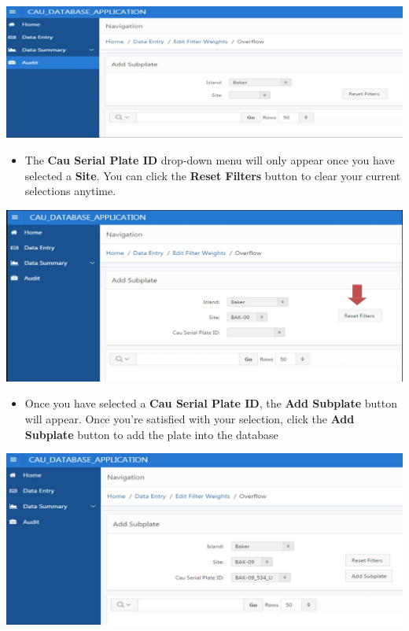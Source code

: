 \documentclass[]{book}
\providecommand{\tightlist}{%
  \setlength{\itemsep}{0pt}\setlength{\parskip}{0pt}}
\begin{document}
\includegraphics{images/Data17.jpg}

\begin{itemize}
\tightlist
\item
  The \textbf{Cau Serial Plate ID} drop-down menu will only appear once you have selected a \textbf{Site}. You can click the \textbf{Reset Filters} button to clear your current selections anytime.
\end{itemize}

\includegraphics{images/Data18.jpg}

\begin{itemize}
\tightlist
\item
  Once you have selected a \textbf{Cau Serial Plate ID}, the \textbf{Add Subplate} button will appear. Once you're satisfied with your selection, click the \textbf{Add Subplate} button to add the plate into the database
\end{itemize}

\includegraphics{images/Data19.jpg}
\end{document}
